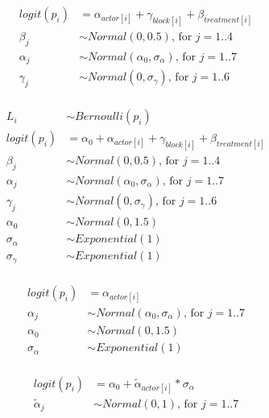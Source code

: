 \documentclass[10pt]{book}
\begin{document}
\begin{mdSnippets}
\begin{mdDisplaySnippet}[78669eb13fbf088c3b8a9a3d55a9a3c5]
\[\begin{aligned}
logit(p_i) &=  \alpha_{actor[i]} + \gamma_{block[i]} + \beta_{treatment[i]} \\
\beta_j &\sim Normal(0, 0.5)\text{, for } j = 1..4 \\
\alpha_j &\sim Normal(\alpha_0, \sigma_{\alpha})\text{, for } j = 1..7 \\
\gamma_j &\sim Normal(0, \sigma_{\gamma})\text{, for } j = 1..6 \\
\end{aligned}
\]%
\end{mdDisplaySnippet}%
\begin{mdDisplaySnippet}[813f15f8070c812b1d1f6d00fba4f8fc]%
\[%
\begin{aligned}
L_i & \sim Bernoulli(p_i) \\ 
logit(p_i) &= \alpha_0 + \alpha_{actor[i]} + \gamma_{block[i]} + \beta_{treatment[i]} \\
\beta_j &\sim Normal(0, 0.5)\text{, for } j = 1..4 \\
\alpha_j &\sim Normal(\alpha_0, \sigma_{\alpha})\text{, for } j = 1..7 \\
\gamma_j &\sim Normal(0, \sigma_{\gamma})\text{, for } j = 1..6 \\
\alpha_0 &\sim Normal(0, 1.5) \\
\sigma_{\alpha} &\sim Exponential(1) \\
\sigma_{\gamma} &\sim Exponential(1) \\
\end{aligned}
\]%
\end{mdDisplaySnippet}%
\begin{mdDisplaySnippet}[8a5db48ad34f0271a8fd526f0f1809ce]%
\[%
\begin{aligned}
logit(p_i) &= \alpha_{actor[i]}  \\
\alpha_j &\sim Normal(\alpha_0, \sigma_{\alpha})\text{, for } j = 1..7 \\
\alpha_0 &\sim Normal(0, 1.5) \\
\sigma_{\alpha} &\sim Exponential(1) \\
\end{aligned}
\]%
\end{mdDisplaySnippet}%
\begin{mdDisplaySnippet}[7ccaec10ea83f691336451fc3076df69]%
\[%
\begin{aligned}
logit(p_i) &= \alpha_0 + \tilde \alpha_{actor[i]} * \sigma_{\alpha} \\
\tilde \alpha_j &\sim Normal(0, 1)\text{, for } j = 1..7 \\

\end{aligned}\]
\end{mdDisplaySnippet}
\end{mdSnippets}
\end{document}
